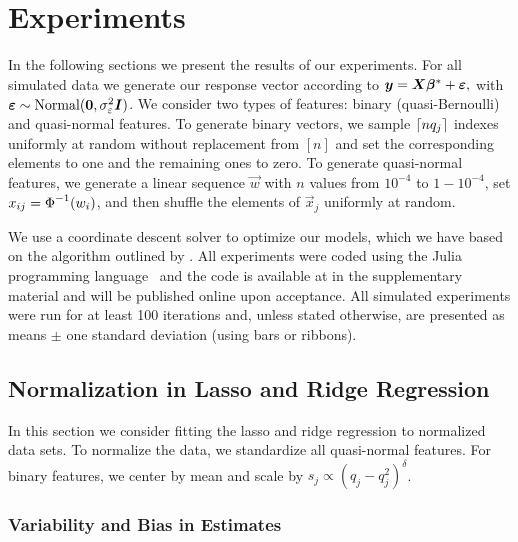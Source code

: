 \section{Experiments}
\label{sec:experiments}

In the following sections we present the results of our experiments. For all simulated data
we generate our response vector according to \(\bm{y} = \bm{X}\bm{\beta}^* +
\bm{\varepsilon},\) with \(\bm{\varepsilon} \sim \operatorname{Normal}(\bm{0}, \sigma_\varepsilon^2
\bm{I})\). We consider two types of features: binary (quasi-Bernoulli) and quasi-normal
features. To generate binary vectors, we sample \(\lceil nq_j \rceil\) indexes uniformly at random
without replacement from \([n]\) and set the corresponding elements to one and the
remaining ones to zero. To generate quasi-normal features, we generate a linear sequence
\(\vec{w}\) with \(n\) values from \(10^{-4}\) to \(1 - 10^{-4}\), set \(x_{ij} =
\operatorname{\Phi}^{-1}(w_i)\), and then shuffle the elements of \(\vec{x}_j\) uniformly at random.

We use a coordinate descent solver to optimize our models, which we have based on the
algorithm outlined by \citet{friedman2010}. All experiments were coded using the Julia
programming language~\citep{bezanson2017} and the code is available at
in the supplementary material and will be published online upon acceptance.
%
All simulated experiments were run for at least 100 iterations and, unless stated
otherwise, are presented as means $\pm$ one standard deviation (using bars or ribbons).

\subsection{Normalization in Lasso and Ridge Regression}%
\label{sec:experiments-lassoridge}

In this section we consider fitting the lasso and ridge regression to normalized data sets.
To normalize the data, we standardize all quasi-normal features. For binary features, we
center by mean and scale by \(s_j \propto (q_j-q_j^2)^\delta\).

\subsubsection{Variability and Bias in Estimates}

